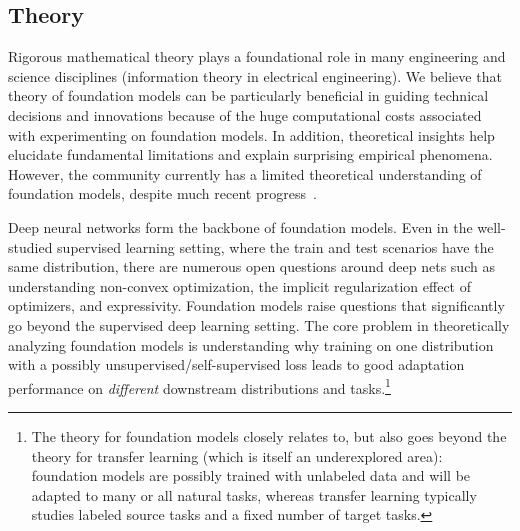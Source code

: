 \newsection
\subsection{Theory}
\label{sec:theory}

\newcommand\lpre{\ensuremath {\ell_{\text{pre}}}}
\newcommand\emppre{\ensuremath {\widehat{L}_{\text{pre}}}}
\newcommand\popadapt{\ensuremath {L_{\text{adapt}}}}
\newcommand\empadapt{\ensuremath {\widehat{L}_{\text{adapt}}}}
\newcommand\poppre{\ensuremath {L_{\text{pre}}}}
\newcommand\datapre{\ensuremath {p_{\text{pre}}}}
\newcommand\trainpre{\ensuremath {\hat{p}_{\text{pre}}}}
\newcommand\datatask{\ensuremath {p_{\text{task}}}}
\newcommand\traintask{\ensuremath {\hat{p}_{\text{task}}}}
\newcommand\thetaum{\ensuremath {\hat{\theta}_{\textup{FM}}}}
\newcommand\gammatask{\ensuremath {\gamma_{\text{task}}}}
\newcommand\ladapt{\ensuremath {\ell_{\text{adapt}}}}
\newcommand\poptest{\ensuremath {L_\text{task}}}

Rigorous mathematical theory plays a foundational role in many engineering and science disciplines (\eg information theory in electrical engineering). We believe that theory of foundation models can be particularly beneficial in guiding technical decisions and innovations because of the huge computational costs associated with experimenting on foundation models. 
In addition, theoretical insights help elucidate fundamental limitations and explain surprising empirical phenomena.
However, the community currently has a limited theoretical understanding of foundation models, despite much recent progress~\cite{arora2019theoretical,haochen2021spectral,wei2021pretrained,wei2020theoretical,zhang2021inductive,saunshi2020mathematical,dao2019kernel,tosh2020contrastive,tosh2021contrastive,cai2021theory,lee2020predicting,zimmermann2021contrastive,bansal2020self,wang2020understanding,tsai2020self,tian2020makes,tian2020understanding, tripuraneni2020theory,du2020fewshot}. 

Deep neural networks form the backbone of foundation models. 
Even in the well-studied supervised learning setting, where the train and test scenarios have the same distribution, there are numerous open questions around deep nets such as understanding non-convex optimization, the implicit regularization effect of optimizers, and expressivity. Foundation models raise questions that significantly go beyond the supervised deep learning setting. 
The core problem in theoretically analyzing foundation models is understanding why training on one distribution with a possibly unsupervised/self-supervised loss leads to good adaptation performance on \emph{different} downstream distributions and tasks.\footnote{The theory for foundation models closely relates to, but also goes beyond the theory for transfer learning (which is itself an underexplored area): foundation models are possibly trained with unlabeled data and will be adapted to many or all natural tasks, whereas transfer learning typically studies labeled source tasks and a fixed number of target tasks.}

